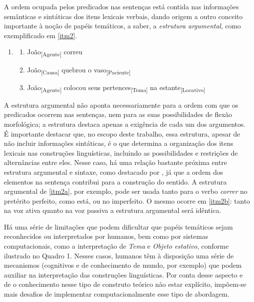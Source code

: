 A ordem ocupada pelos predicados nas sentenças está contida nas
informações semânticas e sintáticas dos itens lexicais verbais, dando
origem a outro conceito importante à noção de papéis temáticos, a saber,
a \emph{estrutura argumental}, como exemplificado em \ref{itm2}.

\begin{enumerate}[start=2,label={(\arabic{enumi})}]
  \item\label{itm2}
    \begin{enumerate}[label=(\arabic{enumi}.\alph*)]
      \item\label{itm2a} João\textsubscript{{[}Agente{]}} correu
      \item\label{itm2b} João\textsubscript{{[}Causa{]}} quebrou o vaso\textsubscript{{[}Paciente{]}}
      \item\label{itm2c} João\textsubscript{{[}Agente{]}} colocou seus pertences\textsubscript{{[}Tema{]}} na estante\textsubscript{{[}Locativo{]}}
    \end{enumerate}
\end{enumerate}

A estrutura argumental não aponta necessariamente para a ordem com que
os predicados ocorrem nas sentenças, nem para as suas possibilidades de
flexão morfológica; a estrutura destaca apenas a exigência de cada um
dos argumentos. É importante destacar que, no escopo deste trabalho,
essa estrutura, apesar de não incluir informações sintáticas, é o que
determina a organização dos itens lexicais nas construções linguísticas,
incluindo as possibilidades e restrições de alternâncias entre eles.
Nesse caso, há uma relação bastante próxima entre estrutura argumental e
sintaxe, como destacado por \textcite{camacho1999}, já que a ordem dos elementos
na sentença contribui para a construção do sentido. A estrutura
argumental de \ref{itm2a}, por exemplo, pode ser usada tanto para o verbo
\emph{correr} no pretérito perfeito, como está, ou no imperfeito. O
mesmo ocorre em \ref{itm2b}: tanto na voz ativa quanto na voz passiva a
estrutura argumental será idêntica.

Há uma série de limitações que podem dificultar que papéis temáticos
sejam reconhecidos ou interpretados por humanos, bem como por sistemas
computacionais, como a interpretação de \emph{Tema} e \emph{Objeto
estativo}, conforme ilustrado no Quadro 1. Nesses casos, humanos têm à
disposição uma série de mecanismos (cognitivos e de conhecimento de
mundo, por exemplo) que podem auxiliar na interpretação das construções
linguísticas. Por conta desse aspecto e de o conhecimento nesse tipo de
construto teórico não estar explícito, impõem-se mais desafios de
implementar computacionalmente esse tipo de abordagem.

